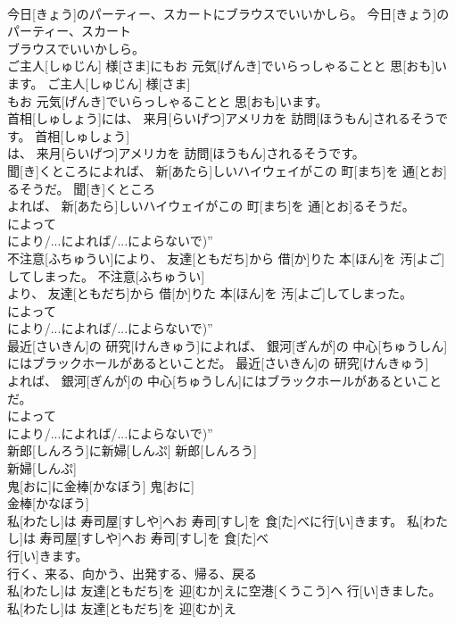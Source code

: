 \documentclass[8pt]{extreport}
\begin{document}
\begin{CJK}{UTF8}{min}
\\	今日[きょう]のパーティー、スカートにブラウスでいいかしら。	今日[きょう]のパーティー、スカート
\\	ブラウスでいいかしら。	
\\	ご主人[しゅじん] 様[さま]にもお 元気[げんき]でいらっしゃることと 思[おも]います。	ご主人[しゅじん] 様[さま]
\\	もお 元気[げんき]でいらっしゃることと 思[おも]います。	
\\	首相[しゅしょう]には、 来月[らいげつ]アメリカを 訪問[ほうもん]されるそうです。	首相[しゅしょう]
\\	は、 来月[らいげつ]アメリカを 訪問[ほうもん]されるそうです。	
\\	聞[き]くところによれば、 新[あたら]しいハイウェイがこの 町[まち]を 通[とお]るそうだ。	聞[き]くところ
\\	よれば、 新[あたら]しいハイウェイがこの 町[まち]を 通[とお]るそうだ。	
\\	によって 
\\	により/...によれば/...によらないで)”
\\	不注意[ふちゅうい]により、 友達[ともだち]から 借[か]りた 本[ほん]を 汚[よご]してしまった。	不注意[ふちゅうい]
\\	より、 友達[ともだち]から 借[か]りた 本[ほん]を 汚[よご]してしまった。	
\\	によって 
\\	により/...によれば/...によらないで)”
\\	最近[さいきん]の 研究[けんきゅう]によれば、 銀河[ぎんが]の 中心[ちゅうしん]にはブラックホールがあるといことだ。	最近[さいきん]の 研究[けんきゅう]
\\	よれば、 銀河[ぎんが]の 中心[ちゅうしん]にはブラックホールがあるといことだ。	
\\	によって 
\\	により/...によれば/...によらないで)”
\\	新郎[しんろう]に新婦[しんぷ]	新郎[しんろう]
\\	新婦[しんぷ]	
\\	鬼[おに]に金棒[かなぼう]	鬼[おに]
\\	金棒[かなぼう]	
\\	私[わたし]は 寿司屋[すしや]へお 寿司[すし]を 食[た]べに行[い]きます。	私[わたし]は 寿司屋[すしや]へお 寿司[すし]を 食[た]べ
\\	行[い]きます。	
\\	行く、来る、向かう、出発する、帰る、戻る
\\	私[わたし]は 友達[ともだち]を 迎[むか]えに空港[くうこう]へ 行[い]きました。	私[わたし]は 友達[ともだち]を 迎[むか]え

\end{CJK}
\end{document}
